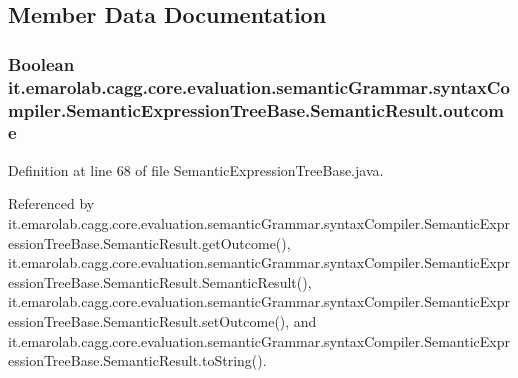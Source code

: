 \subsection{Member Data Documentation}
\hypertarget{classit_1_1emarolab_1_1cagg_1_1core_1_1evaluation_1_1semanticGrammar_1_1syntaxCompiler_1_1Semant5d395032261986aec1b33357dd21b6bb_a003ca6665aea086a84e732528f210272}{
\subsubsection[{outcome}]{\setlength{\rightskip}{0pt plus 5cm}Boolean it.\-emarolab.\-cagg.\-core.\-evaluation.\-semantic\-Grammar.\-syntax\-Compiler.\-Semantic\-Expression\-Tree\-Base.\-Semantic\-Result.\-outcome\hspace{0.3cm}{\ttfamily [private]}}}\label{classit_1_1emarolab_1_1cagg_1_1core_1_1evaluation_1_1semanticGrammar_1_1syntaxCompiler_1_1Semant5d395032261986aec1b33357dd21b6bb_a003ca6665aea086a84e732528f210272}


Definition at line 68 of file Semantic\-Expression\-Tree\-Base.\-java.



Referenced by it.\-emarolab.\-cagg.\-core.\-evaluation.\-semantic\-Grammar.\-syntax\-Compiler.\-Semantic\-Expression\-Tree\-Base.\-Semantic\-Result.\-get\-Outcome(), it.\-emarolab.\-cagg.\-core.\-evaluation.\-semantic\-Grammar.\-syntax\-Compiler.\-Semantic\-Expression\-Tree\-Base.\-Semantic\-Result.\-Semantic\-Result(), it.\-emarolab.\-cagg.\-core.\-evaluation.\-semantic\-Grammar.\-syntax\-Compiler.\-Semantic\-Expression\-Tree\-Base.\-Semantic\-Result.\-set\-Outcome(), and it.\-emarolab.\-cagg.\-core.\-evaluation.\-semantic\-Grammar.\-syntax\-Compiler.\-Semantic\-Expression\-Tree\-Base.\-Semantic\-Result.\-to\-String().

